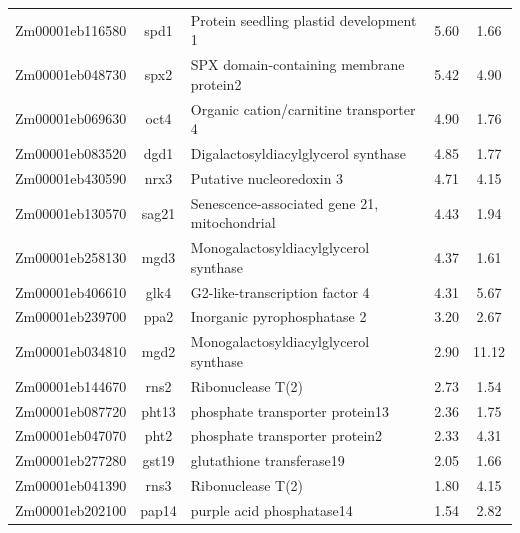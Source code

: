 \documentclass[9pt,twocolumn,twoside]{rilabRxiv}
\begin{document}
\begin{table}[h!]
\begin{tabular}{ccp{7.5cm}cc}
Zm00001eb116580 & spd1 & Protein seedling plastid development 1 & 5.60 & 1.66\\
Zm00001eb048730 & spx2 & SPX domain-containing membrane protein2 & 5.42 & 4.90\\
Zm00001eb069630 & oct4 & Organic cation/carnitine transporter 4 & 4.90 & 1.76\\
Zm00001eb083520 & dgd1 & Digalactosyldiacylglycerol synthase & 4.85 & 1.77\\
Zm00001eb430590 & nrx3 & Putative nucleoredoxin 3 & 4.71 & 4.15\\
Zm00001eb130570 & sag21 & Senescence-associated gene 21, mitochondrial & 4.43 & 1.94\\
Zm00001eb258130 & mgd3 & Monogalactosyldiacylglycerol synthase & 4.37 & 1.61\\
Zm00001eb406610 & glk4 & G2-like-transcription factor 4 & 4.31 & 5.67\\
Zm00001eb239700 & ppa2 & Inorganic pyrophosphatase 2 & 3.20 & 2.67\\
Zm00001eb034810 & mgd2 & Monogalactosyldiacylglycerol synthase & 2.90 & 11.12\\
Zm00001eb144670 & rns2 & Ribonuclease T(2) & 2.73 & 1.54\\
Zm00001eb087720 & pht13 & phosphate transporter protein13 & 2.36 & 1.75\\
Zm00001eb047070 & pht2 & phosphate transporter protein2 & 2.33 & 4.31\\
Zm00001eb277280 & gst19 & glutathione transferase19 & 2.05 & 1.66\\
Zm00001eb041390 & rns3 & Ribonuclease T(2) & 1.80 & 4.15\\
Zm00001eb202100 & pap14 & purple acid phosphatase14 & 1.54 & 2.82\\
\hline
\end{tabular}
\end{table}
\end{document}
